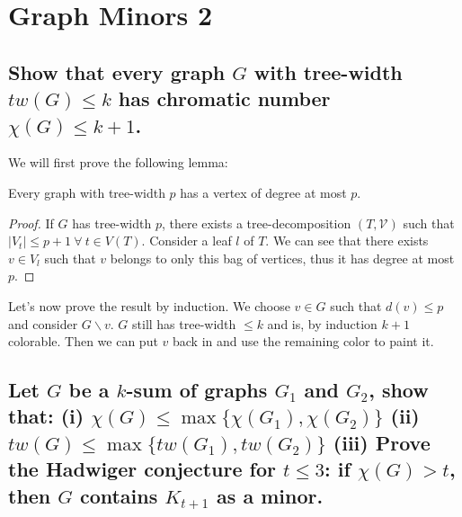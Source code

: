 \section{Graph Minors 2}

\subsection[Minors 2 - 1]{Show that every graph $G$ with tree-width $tw(G) \leq k$ has chromatic number $\chi(G) \leq k + 1$.}

We will first prove the following lemma:
\begin{lemma}
    Every graph with tree-width $p$ has a vertex of degree at most $p$.
\end{lemma}
\begin{proof}
    If $G$ has tree-width $p$, there exists a tree-decomposition $(T, \mathcal{V})$ such that $|V_t| \leq p + 1 \: \forall \: t \in V(T)$.
    Consider a leaf $l$ of $T$.
    We can see that there exists $v \in V_l$ such that $v$ belongs to only this bag of vertices, thus it has degree at most $p$.
\end{proof}

Let's now prove the result by induction.
We choose $v \in G$ such that $d(v) \leq p$ and consider $G \backslash v$.
$G$ still has tree-width $\leq k$ and is, by induction $k + 1$ colorable.
Then we can put $v$ back in and use the remaining color to paint it.

\subsection[Minors 2 - 3]{Let $G$ be a $k$-sum of graphs $G_1$ and $G_2$, show that: (i) $\chi(G) \leq \max\{\chi(G_1), \chi(G_2)\}$ (ii) $tw(G) \leq \max\{tw(G_1), tw(G_2)\}$ (iii) Prove the Hadwiger conjecture for $t \leq 3$: if $\chi(G) > t$, then $G$ contains $K_{t+1}$ as a minor.}

